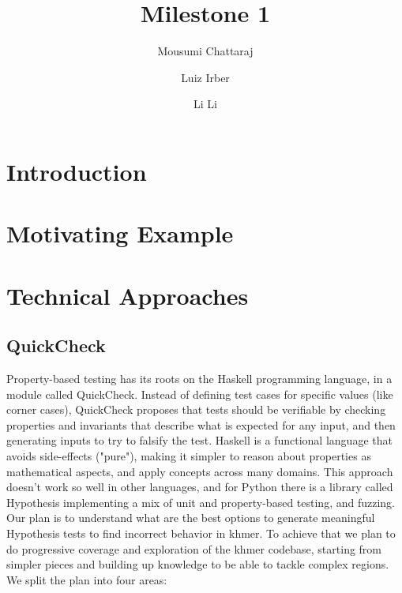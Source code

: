 \documentclass[preprint,nocopyrightspace]{sig-alternate}
\begin{document}
%

\title{Milestone 1}

\author{Mousumi Chattaraj}
\author{Luiz Irber}
\author{Li Li}


\maketitle

\begin{abstract}


\end{abstract}

\section{Introduction}

\section{Motivating Example}
\section{Technical Approaches}
\subsection{QuickCheck}
Property-based testing has its roots on the Haskell programming language, in a module called QuickCheck. Instead of defining test cases for specific values (like corner cases), QuickCheck proposes that tests should be verifiable by checking properties and invariants that describe what is expected for any input, and then generating inputs to try to falsify the test.
Haskell is a functional language that avoids side-effects ("pure"), making it simpler to reason about properties as mathematical aspects, and apply concepts across many domains. This approach doesn't work so well in other languages, and for Python there is a library called Hypothesis implementing a mix of unit and property-based testing, and fuzzing.
 \subection{}
Our plan is to understand what are the best options to generate meaningful Hypothesis tests to find incorrect behavior in khmer.
To achieve that we plan to do progressive coverage and exploration of the khmer codebase, starting from simpler pieces and building up knowledge to be able to tackle complex regions. We split the plan into four areas:
\end{document}
